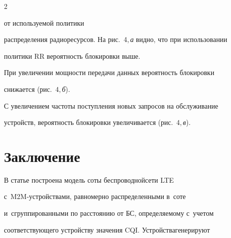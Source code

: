 \begin{multicols}{2}
{}





\vspace*{9.5pt}





\addtocounter{figure}{1}








\noindent


 от используемой политики 


распределения радиоресурсов. На рис.~4,\,\textit{а} видно, что при использовании 


политики RR вероятность блокировки выше. 


  


  При увеличении мощности передачи данных вероятность блокировки 


снижается (рис.~4,\,\textit{б}). 


  








  


  С увеличением частоты поступления новых запросов на обслуживание 


устройств, вероятность блокировки увеличивается (рис.~4,\,\textit{в}). 










\section{Заключение}





  В статье построена модель соты беспроводной\linebreak сети LTE  


с~M2M-устрой\-ст\-ва\-ми, равномерно распределенными в~соте 


и~сгруппированными по расстоянию от БС, определяемому с~учетом 


соответ\-ствующего устройству значения CQI. Устройства\linebreak генерируют 



\end{multicols}
